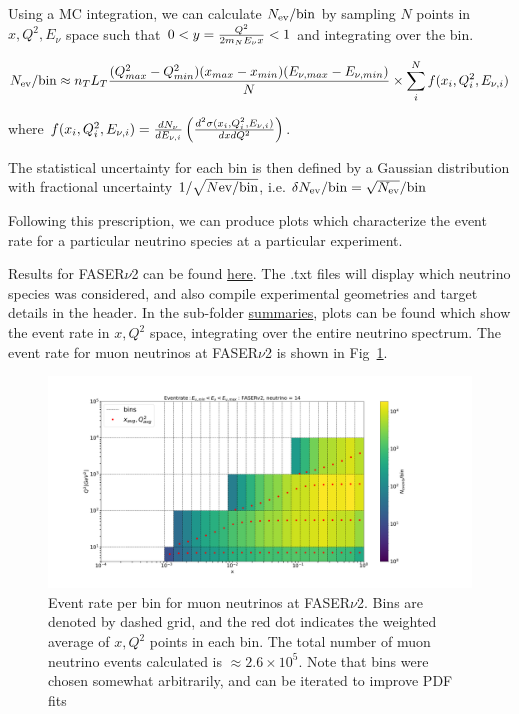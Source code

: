 \documentclass[11pt,a4paper]{article}
\def\frac#1#2{{{#1}\over {#2}}}
\numberwithin{equation}{section}
\numberwithin{figure}{section}
\numberwithin{table}{section}
\begin{document}
Using a MC integration, we can calculate $N_{\rm ev}/{\rm bin}$ by sampling $N$ points in $x,Q^2,E_{\nu}$ space such that $0< y = \frac{Q^2}{2m_N E_{\nu }x} < 1$ and integrating over the bin.

\begin{equation}
    N_{\rm ev}/{\rm bin} \approx n_T L_T \frac{(Q^2_{max}-Q^2_{min})(x_{max}-x_{min})(E_{\nu ,max}-E_{\nu ,min})}{N}\times \sum_i^N f(x_i,Q^2_i,E_{\nu ,i})
    \label{MCintegration}
\end{equation}

where $f(x_i,Q^2_i,E_{\nu ,i}) = \frac{dN_{\nu}}{dE_{\nu,i}}\left(\frac{d^2\sigma(x_i,Q^2_i,E_{\nu,i})}{dxdQ^2}\right)$. 

The statistical uncertainty for each bin is then defined by a Gaussian distribution with fractional uncertainty $1/\sqrt{N{\rm ev}/{\rm bin}}$, i.e. $\delta N_{\rm ev}/{\rm bin} = \sqrt{N_{\rm ev}} /{\rm bin}$


  Following this prescription, we can produce plots which characterize the event rate for a particular neutrino species at a particular experiment. 

Results for FASER$\nu$2 can be found \href{https://github.com/juanrojochacon/FPF-WG1/tree/main/results}{here}. The .txt files will display which neutrino species was considered, and also compile experimental geometries and target details in the header. In the sub-folder \href{https://github.com/juanrojochacon/FPF-WG1/tree/main/results/Summaries}{summaries}, plots can be found which show the event rate in $x,Q^2$ space, integrating over the entire neutrino spectrum. The event rate for muon neutrinos at FASER$\nu$2 is shown in Fig~\ref{fig:fasernu2_muon}.

\begin{figure}[h]
    \centering
\includegraphics[width=1\textwidth]{Nevent_FASERv2_14.pdf}
    \caption{Event rate per bin for muon neutrinos at FASER$\nu$2. Bins are denoted by dashed grid, and the red dot indicates the weighted average of $x,Q^2$ points in each bin. The total number of muon neutrino events calculated is $\approx2.6\times 10^5$. Note that bins were chosen somewhat arbitrarily, and can be iterated to improve PDF fits }
    \label{fig:fasernu2_muon}
\end{figure}
\end{document}
